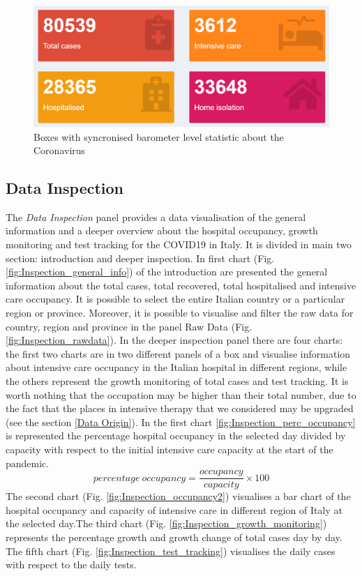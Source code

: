 \documentclass[
12pt, %
a4paper, %
oneside, %
headinclude,footinclude, %
BCOR5mm, %
]{scrartcl}
\begin{document}
\begin{figure}[h]
 \centering
 \includegraphics[width=0.5\linewidth]{Figures/Home_figure_3.png} 
 \caption{Boxes with syncronised barometer level statistic about the Coronavirus}
 \label{Home_fig3}
\end{figure}


\subsection{Data Inspection}\label{Data Inspection}

The \textit{Data Inspection} panel provides a data visualisation of the general information and a deeper overview about the hospital occupancy, growth monitoring and test tracking for the COVID19 in Italy. It is divided in main two section: introduction and deeper inspection. In first chart (Fig. \ref{fig:Inspection_general_info}) of the introduction are presented the general information about the total cases, total recovered, total hospitalised and intensive care occupancy. It is possible to select the entire Italian country or a particular region or province. Moreover, it is possible to visualise and filter the raw data for country, region and province in the panel Raw Data (Fig. \ref{fig:Inspection_rawdata}). In the deeper inspection panel there are four charts: the first two charts are in two different panels of a box and visualise information about intensive care occupancy in the Italian hospital in different regions, while the others represent the growth monitoring of total cases and test tracking. It is worth nothing that the occupation may be higher than their total number, due to the fact that the places in intensive therapy that we considered may be upgraded (see the section \ref{Data Origin}). In the first chart \ref{fig:Inspection_perc_occupancy} is represented the percentage hospital occupancy in the selected day divided by capacity with respect to the initial intensive care capacity at the start of the pandemic.
\begin{equation}
percentage~occupancy = \dfrac{occupancy}{capacity} \times 100
\end{equation}
The second chart (Fig. \ref{fig:Inspection_occupancy2}) visualises a bar chart of the hospital occupancy and capacity of intensive care in different region of Italy at the selected day.The third chart (Fig. \ref{fig:Inspection_growth_monitoring}) represents the percentage growth and growth change of total cases day by day. The fifth chart (Fig. \ref{fig:Inspection_test_tracking}) visualises the daily cases with respect to the daily tests.
\end{document}
